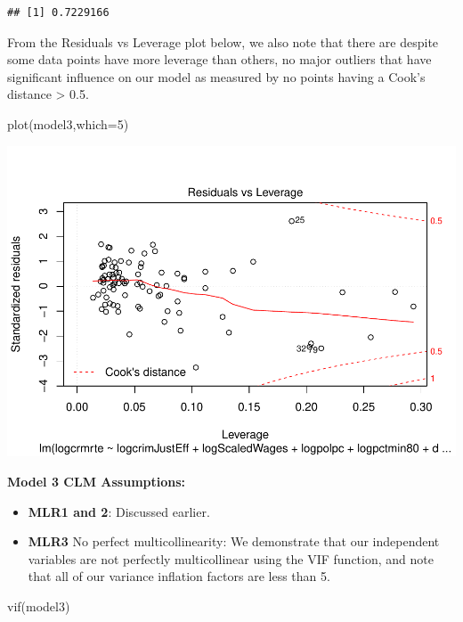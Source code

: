 \documentclass[]{article}
\newenvironment{Shaded}{}{}
\newcommand{\DataTypeTok}[1]{#1}
\newcommand{\DecValTok}[1]{#1}
\newcommand{\KeywordTok}[1]{\textcolor[rgb]{0.00,0.00,1.00}{#1}}
\newcommand{\NormalTok}[1]{#1}
\begin{document}
\begin{verbatim}
## [1] 0.7229166
\end{verbatim}

From the Residuals vs Leverage plot below, we also note that there are
despite some data points have more leverage than others, no major
outliers that have significant influence on our model as measured by no
points having a Cook's distance \textgreater{} 0.5.

\begin{Shaded}
\begin{Highlighting}[]
\KeywordTok{plot}\NormalTok{(model3,}\DataTypeTok{which=}\DecValTok{5}\NormalTok{)}
\end{Highlighting}
\end{Shaded}

\includegraphics{Bagnard_Gaustad_Hartman_Leung_Lab_3_files/figure-latex/unnamed-chunk-83-1.pdf}

\textbf{Model 3 CLM Assumptions:}

\begin{itemize}
\item
  \textbf{MLR1 and 2}: Discussed earlier.
\item
  \textbf{MLR3} No perfect multicollinearity: We demonstrate that our
  independent variables are not perfectly multicollinear using the VIF
  function, and note that all of our variance inflation factors are less
  than 5.
\end{itemize}

\begin{Shaded}
\begin{Highlighting}[]
\KeywordTok{vif}\NormalTok{(model3)}
\end{Highlighting}
\end{Shaded}
\end{document}
